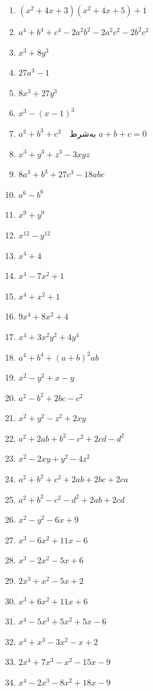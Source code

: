 \documentclass[12pt,a4paper]{article}
\begin{document}
\begin{enumerate}
\item $(x^2 + 4x + 3)(x^2 + 4x + 5) + 1$
\item $a^4 + b^4 + c^4 - 2a^2 b^2 - 2a^2 c^2 - 2b^2 c^2$
\item $x^3 + 8y^3$
\item $27a^3 - 1$
\item $8x^3 + 27y^3$
\item $x^3 - (x-1)^3$
\item $a^3 + b^3 + c^3 \quad \text{به‌شرط } a + b + c = 0$
\item $x^3 + y^3 + z^3 - 3xyz$
\item $8a^3 + b^3 + 27c^3 - 18abc$
\item $a^6 - b^6$
\item $x^9 + y^9$
\item $x^{12} - y^{12}$

\setcounter{enumi}{42}
\item $x^4 + 4$
\item $x^4 - 7x^2 + 1$
\item $x^4 + x^2 + 1$
\item $9x^4 + 8x^2 + 4$
\item $x^4 + 3x^2 y^2 + 4y^4$
\item $a^4 + b^4 + (a+b)^2 ab$

\setcounter{enumi}{48}
\item $x^2 - y^2 + x - y$
\item $a^2 - b^2 + 2bc - c^2$
\item $x^2 + y^2 - z^2 + 2xy$
\item $a^2 + 2ab + b^2 - c^2 + 2cd - d^2$
\item $x^2 - 2xy + y^2 - 4z^2$
\item $a^2 + b^2 + c^2 + 2ab + 2bc + 2ca$
\item $a^2 + b^2 - c^2 - d^2 + 2ab + 2cd$
\item $x^2 - y^2 - 6x + 9$

\setcounter{enumi}{56}
\item $x^3 - 6x^2 + 11x - 6$
\item $x^3 - 2x^2 - 5x + 6$
\item $2x^3 + x^2 - 5x + 2$
\item $x^3 + 6x^2 + 11x + 6$
\item $x^4 - 5x^3 + 5x^2 + 5x - 6$
\item $x^4 + x^3 - 3x^2 - x + 2$
\item $2x^4 + 7x^3 - x^2 - 15x - 9$
\item $x^4 - 2x^3 - 8x^2 + 18x - 9$


\end{enumerate}
\end{document}
